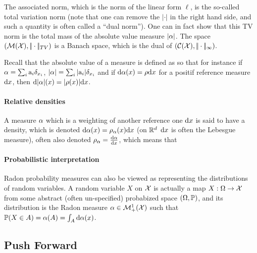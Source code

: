The associated norm, which is the norm of the linear form $\ell$, is the so-called total variation norm
(note that one can remove the $|\cdot|$ in the right hand side, and such a quantity is often called a ``dual norm'').
%
One can in fact show that this TV norm is the total mass of the absolute value measure $|\alpha|$.
%
The space $(\mathcal{M}(\mathcal{X}),|\!| \cdot |\!|_{TV})$ is a Banach space, which is the dual of $(\mathcal{C}(\mathcal{X}),|\!| \cdot |\!|_\infty)$. 

Recall that the absolute value of a measure is defined as 
so that for instance if $\alpha=\sum_i \mathrm{a}_i \delta_{x_i}$, $|\alpha|=\sum_i |\mathrm{a}_i| \delta_{x_i}$ and if $\mathrm{d}\alpha(x) = \rho \mathrm{d} x$ for a positif reference measure $\mathrm{d} x$, then $\mathrm{d}|\alpha|(x) = |\rho(x)| \mathrm{d} x$. 



\paragraph{Relative densities}

A measure $\alpha$ which is a weighting of another reference one $\mathrm{d} x$ is said to have a density, which is denoted $\mathrm{d}\alpha(x)=\rho_{\alpha}(x)\mathrm{d} x$  (on $\mathbb{R}^d$ $\mathrm{d} x$ is often the Lebesgue measure), often also denoted $\rho_{\alpha} = \frac{\mathrm{d}\alpha}{\mathrm{d} x}$, which means that 

\paragraph{Probabilistic interpretation}

Radon probability measures can also be viewed as representing the distributions of random variables. A random variable $X$ on $\mathcal{X}$ is actually a map $X : \Omega \rightarrow \mathcal{X}$ from some abstract (often un-specified) probabized space $(\Omega,\mathbb{P})$, and its distribution is the Radon measure $\alpha \in \mathcal{M}_+^1(\mathcal{X})$ such that $\mathbb{P}(X \in A) = \alpha(A)=\int_A \mathrm{d}\alpha(x)$.


\subsection{Push Forward}
  

